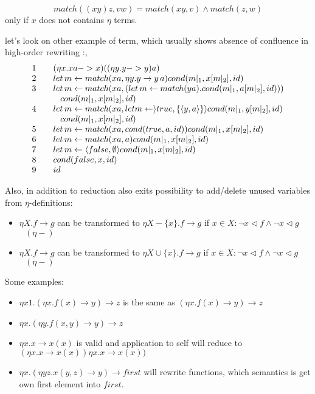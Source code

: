 \documentclass[10pt]{article}
\begin{document}
  $$match((x y) z, v w)=match(x y,v)\land match(z,w)$$ only if $x$ does not contains 
   $\eta$ terms.
   
let's look on other example of term, which usually shows absence of confluence in high-order rewriting \cite{DBLP:conf/rta/CirsteaF07}:,
$$ 
\begin{array}{l l l}
   1 &  &  (\eta x. x a -> x) ((\eta y. y->y) a) \\
   2 &  &  let\,m\leftarrow match(x a, \eta y.y\to y\, a) 
           cond(m|_{1},x[m|_{2}],id) \\
   3 &  &  let\,m \leftarrow match(x a,(
             let\, m \leftarrow match(y a).cond(m|_{1},a[m|_2],id)
                                 )    ) \\
     &   & \,\,\,\,\,         cond(m|_{1},x[m|_{2}],id)\\
   4 &   & let\,m\leftarrow match(x a, 
                               let m\leftarrow\rangle true, \{\langle y,a\rangle\}\rangle
                               cond(m|_{1},y[m|_{2}],id)\\
     &   & \,\,\,\,\,         cond(m|_{1},x[m|_{2}],id)\\                            
   5 &   &  let\,m\leftarrow match(x a,cond(true,a,id)) cond(m|_{1},x[m|_2],id) \\
   6 &   &  let\,m\leftarrow match(x a,a) cond(m|_{1},x[m|_2],id) \\  
   7 &   &  let\,m\leftarrow \langle false, \emptyset \rangle cond(m|_{1},x[m|_{2}],id) \\
   8 &   &  cond(false,x,id) \\ 
   9 &   &  id                     
\end{array}
$$ 
  
  Also, in addition to reduction also exits possibility to add/delete unused variables
  from $\eta$-definitions: 
  \begin{itemize}
    \item $\eta X. f \to g$ can be transformed to $\eta X-\{x\}. f \to g$
        if $x \in X: \neg x \lhd f \land \neg x \lhd g $ $\,\,\,\,(\eta -)$
    \item $\eta X. f \to g$ can be transformed to $\eta X\cup\{x\}. f \to g$
        if $x \in X: \neg x \lhd f \land \neg x \lhd g $ $\,\,\,\,(\eta -)$      
  \end{itemize}



Some examples:
\begin{itemize}
 \item $\eta x1. (\eta x. f(x) \to y) \to z $ is the same as $(\eta x. f(x) \to y) \to z$  
 \item $\eta x. (\eta y. f(x,y) \to y) \to z $ 
 \item $\eta x. x \to x(x)$ is valid and application to self will reduce to
  $(\eta x. x \to x(x))\eta x. x \to x(x))$
 \item  $\eta x .(\eta y z. x(y,z) \to y) \to first$ will rewrite functions, which semantics
 is get own first element into $first$.
\end{itemize}
\end{document}
